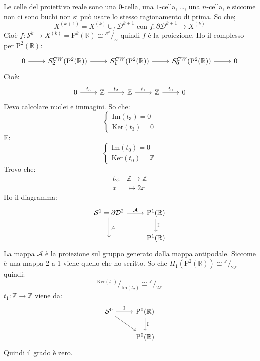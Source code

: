 \documentclass[10pt, twoside=false, x11names]{scrbook}
\newcommand{\Z}{\mathbb{Z}}
\newcommand{\im}[1]{\mathrm{Im}( #1 )}
\renewcommand{\ker}[1]{\mathrm{Ker}( #1)}
\newcommand{\Pjr}[1]{\mathrm{P}^#1 (\mathbb{R})}
\newcommand{\Id}[1][]{\mathbb{I}_#1}
\newcommand{\Sph}[1][]{\mathcal{S}^#1}
\newcommand{\Disk}[1][]{\mathcal{D}^#1}
\newcommand*\quot[2]{{^{\textstyle #1}\big/_{\textstyle #2}}}
\begin{document}
Le celle del proiettivo reale sono una $ 0 $-cella,
una $ 1 $-cella, \dots, una $ n $-cella, e siccome non ci
sono buchi non si può usare lo stesso ragionamento di prima.
So che;
\[
  X^{(k+1)} = X^{(k)} \cup_f \Disk{k+1} \text{ con } f \colon \partial \Disk{k+1} \to X^{(k)}
\]
Cioè $ f \colon \Sph{k} \to X^{(k)} = \Pjr{k} \cong \quot{\Sph{k}}{\sim} $
quindi $ f $ è la proiezione.
Ho il complesso per $ \Pjr{2} $:
\[
  \begin{tikzcd}
    0 \rar & S^{CW}_{2}(\Pjr{2}) \rar & S_1^{CW}(\Pjr{2}) \rar & S_{0}^{CW}(\Pjr{2}) \rar & 0
  \end{tikzcd}
\]
Cioè:
\[
  \begin{tikzcd}
    0 \rar{t_3} & \Z \rar{t_2} & \Z \rar{t_1} & \Z \rar{t_0} & 0
  \end{tikzcd}
\]
Devo calcolare nuclei e immagini. So che:
\[
  \begin{cases}
    \im{t_3} = 0 \\
    \ker{t_3} = 0
  \end{cases}
\]
E:
\[
  \begin{cases}
    \im{t_0} = 0\\
    \ker{t_0} = \Z
  \end{cases}
\]
Trovo che:
\begin{align*}
  t_2 \colon & \Z \to \Z \\
  x & \mapsto 2 x
\end{align*}
Ho il diagramma:
\[
  \begin{tikzcd}
    \Sph{1} = \partial \Disk{2} \rar{\mathcal{A}} \dar{\mathcal{A}} & \Pjr{1} \dar{\Id{}} \\
    {} & \Pjr{1}
  \end{tikzcd}
\]
La mappa $ \mathcal{A} $ è la proiezione sul gruppo generato dalla mappa antipodale.
Siccome è una mappa 2 a 1 viene quello che ho scritto.
So che $ H_1(\Pjr{2}) \cong \quot{\Z}{2 \Z} $ quindi:
\[
  \quot{\ker{t_1}}{\im{t_2}} \cong \quot{\Z}{2 \Z}
\]
$ t_1 \colon \Z \to \Z $ viene da:
\[
  \begin{tikzcd}
    \Sph{0} \rar{\Id{}} \arrow{rd}{} & \Pjr{0} \dar{\Id{}} \\
    {} & \Pjr{0}
  \end{tikzcd}
\]
Quindi il grado è zero.
\end{document}
